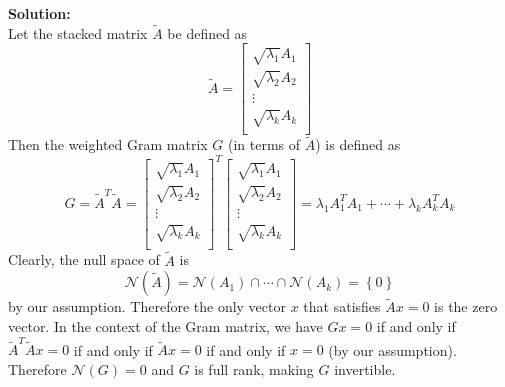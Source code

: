 \begin{enumerate}[label=(\alph*)]
	      \begin{tcolorbox}
		      \textbf{Solution:} \\
		      Let the stacked matrix $\tilde{A}$ be defined as
		      $$
			      \tilde{A} =
			      \begin{bmatrix}
				      \sqrt{\lambda_1} A_1 \\
				      \sqrt{\lambda_2} A_2 \\
				      \vdots               \\
				      \sqrt{\lambda_k} A_k \\
			      \end{bmatrix}$$
		      Then the weighted Gram matrix $G$ (in terms of $\tilde{A}$) is defined as
		      $$
			      G = \tilde{A}^T \tilde{A} =
			      \begin{bmatrix}
				      \sqrt{\lambda_1} A_1 \\
				      \sqrt{\lambda_2} A_2 \\
				      \vdots               \\
				      \sqrt{\lambda_k} A_k \\
			      \end{bmatrix}^T
			      \begin{bmatrix}
				      \sqrt{\lambda_1} A_1 \\
				      \sqrt{\lambda_2} A_2 \\
				      \vdots               \\
				      \sqrt{\lambda_k} A_k \\
			      \end{bmatrix} = \lambda_1 A_1^T A_1 + \cdots + \lambda_k A_k^T A_k
		      $$
		      Clearly, the null space of $\tilde{A}$ is
		      $$\mathcal{N}(\tilde{A}) =
			      \mathcal{N}(A_1) \cap \cdots \cap \mathcal{N}(A_k) = \left\{ 0
			      \right\}$$
		      by our assumption. Therefore the only vector $x$ that satisfies $
			      \tilde{A}x = 0$ is the zero vector. In the context of the Gram
		      matrix, we have $Gx = 0$ if and only if $\tilde{A}^T \tilde{A}x =
			      0$ if and only if $\tilde{A}x = 0$ if and only if $x = 0$ (by
		      our assumption). Therefore $\mathcal{N}(G) = 0$ and $G$ is
		      full rank, making $G$ invertible.
	      \end{tcolorbox}


\end{enumerate}
